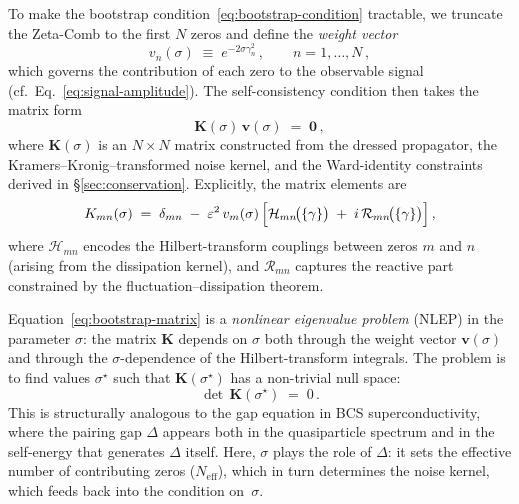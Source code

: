 \documentclass[12pt,a4paper]{article}
\begin{document}
To make the bootstrap condition~\eqref{eq:bootstrap-condition}
tractable, we truncate the Zeta-Comb to the first $N$ zeros and
define the \emph{weight vector}
%
\begin{equation}
  v_{n}(\sigma) \;\equiv\; e^{-2\sigma\gamma_{n}^{2}}\,,
  \qquad n = 1,\ldots,N\,,
  \label{eq:weight-vector}
\end{equation}
%
which governs the contribution of each zero to the observable
signal (cf.\ Eq.~\eqref{eq:signal-amplitude}).
The self-consistency condition then takes the matrix form
%
\begin{equation}
  \mathbf{K}(\sigma)\,\mathbf{v}(\sigma) \;=\; \mathbf{0}\,,
  \label{eq:bootstrap-matrix}
\end{equation}
%
where $\mathbf{K}(\sigma)$ is an $N\times N$ matrix constructed from
the dressed propagator, the Kramers--Kronig--transformed noise kernel,
and the Ward-identity constraints derived in \S\ref{sec:conservation}.
Explicitly, the matrix elements are
%
\begin{equation}
  K_{mn}(\sigma)
  \;=\;
  \delta_{mn}
  \;-\;
  \varepsilon^{2}\,v_{m}(\sigma)\,
  \Bigl[
    \mathcal{H}_{mn}\!\bigl(\{\gamma\}\bigr)
    \;+\;
    i\,\mathcal{R}_{mn}\!\bigl(\{\gamma\}\bigr)
  \Bigr]\,,
  \label{eq:K-matrix-elements}
\end{equation}
%
where $\mathcal{H}_{mn}$ encodes the Hilbert-transform couplings
between zeros $m$ and $n$ (arising from the dissipation kernel), and
$\mathcal{R}_{mn}$ captures the reactive part constrained by the
fluctuation--dissipation theorem.

Equation~\eqref{eq:bootstrap-matrix} is a \emph{nonlinear eigenvalue
problem} (NLEP) in the parameter $\sigma$: the matrix $\mathbf{K}$
depends on $\sigma$ both through the weight vector $\mathbf{v}(\sigma)$
and through the $\sigma$-dependence of the Hilbert-transform integrals.
The problem is to find values $\sigma^{\star}$ such that
$\mathbf{K}(\sigma^{\star})$ has a non-trivial null space:
%
\begin{equation}
  \det\,\mathbf{K}(\sigma^{\star}) \;=\; 0\,.
  \label{eq:det-condition}
\end{equation}
%
This is structurally analogous to the gap equation in BCS
superconductivity, where the pairing gap $\Delta$ appears both in the
quasiparticle spectrum and in the self-energy that generates $\Delta$
itself.  Here, $\sigma$ plays the role of $\Delta$: it sets the
effective number of contributing zeros ($N_{\mathrm{eff}}$), which in
turn determines the noise kernel, which feeds back into the condition
on~$\sigma$.
\end{document}
